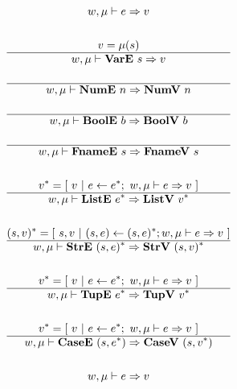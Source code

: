 
\begin{gather*}
  w, \mu \vdash e \Rightarrow v \\
%
\newline \\
  v = \mu(s) \\
  \hline
  w, \mu \vdash \vare ~ s \Rightarrow v \\
%
\newline \\
  \hline
  w, \mu \vdash \nume ~ n \Rightarrow \numv ~ n \\
%
\newline \\
  \hline
  w, \mu \vdash \boole ~ b \Rightarrow \boolv ~ b \\
%
\newline \\
  \hline
  w, \mu \vdash \fnamee ~ s \Rightarrow \fnamev ~ s \\
%
\newline \\
  \seq{v} = [ ~ v ~ | ~ e \leftarrow \seq{e}; ~ w, \mu \vdash e \Rightarrow v ~ ] \\
  \hline
  w, \mu \vdash \liste ~ \seq{e} \Rightarrow \listv ~ \seq{v} \\
%
\newline \\
  \seq{(s, v)} =
    [ ~
      s, v
    ~ | ~
      (s, e) \leftarrow \seq{(s, e)}; w, \mu \vdash e \Rightarrow v
    ~ ] \\
  \hline
  w, \mu \vdash \stre ~ \seq{(s, e)} \Rightarrow \strv ~ \seq{(s, v)} \\
%
\newline \\
  \seq{v} = [ ~ v ~ | ~ e \leftarrow \seq{e}; ~ w, \mu \vdash e \Rightarrow v ~ ] \\
  \hline
  w, \mu \vdash \tupe ~ \seq{e} \Rightarrow \tupv ~ \seq{v} \\
%
\newline \\
  \seq{v} = [ ~ v ~ | ~ e \leftarrow \seq{e}; ~ w, \mu \vdash e \Rightarrow v ~ ] \\
  \hline
  w, \mu \vdash \casee ~ (s, \seq{e}) \Rightarrow \casev ~ (s, \seq{v}) \\
%
\newline \\
  w, \mu \vdash e \Rightarrow v \\

\end{gather*}
